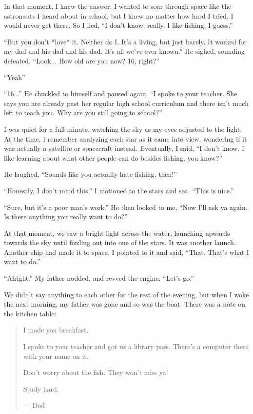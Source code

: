 In that moment, I knew the answer.
I wanted to soar through space like the astronauts I heard about in school, but I knew no matter how hard I tried, I would never get there.
So I lied, ``I don't know, really. I like fishing, I guess.''

``But you don't *love* it. Neither do I. It's a living, but just barely. It worked for my dad and his dad and his dad. It's all we've ever known.''
He sighed, sounding defeated.
``Look... How old are you now? 16, right?''

``Yeah''

``16...'' He chuckled to himself and paused again. ``I spoke to your teacher. She says you are already past her regular high school curriculum and there isn't much left to teach you. Why are you still going to school?''

I was quiet for a full minute, watching the sky as my eyes adjusted to the light.
At the time, I remember analyzing each star as it came into view, wondering if it was actually a satellite or spacecraft instead.
Eventually, I said, ``I don't know. I like learning about what other people can do besides fishing, you know?''

He laughed, ``Sounds like you actually hate fishing, then!''

``Honestly, I don't mind this.'' I motioned to the stars and sea. ``This is nice.''

``Sure, but it's a poor man's work.'' He then looked to me, ``Now I'll ask ya again. Is there anything you really want to do?''

At that moment, we saw a bright light across the water, launching upwards towards the sky until fizzling out into one of the stars.
It was another launch.
Another ship had made it to space.
I pointed to it and said, ``That. That's what I want to do.''

``Alright.'' My father nodded, and revved the engine. ``Let's go.''

We didn't say anything to each other for the rest of the evening, but when I woke the next morning, my father was gone and so was the boat.
There was a note on the kitchen table:

\begin{quote}
I made you breakfast.

I spoke to your teacher and got us a library pass.
There's a computer there with your name on it.

Don't worry about the fish.
They won't miss ya!

Study hard.

--- Dad
\end{quote}

